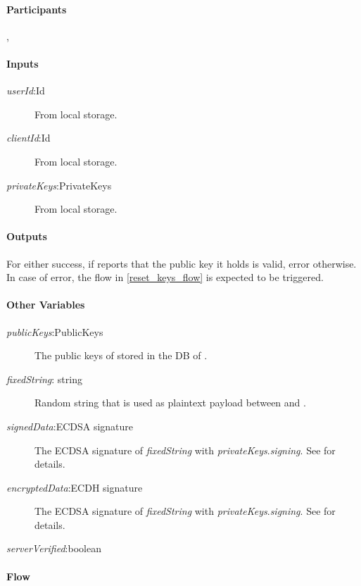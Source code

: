 \documentclass[a4paper,10pt,draft]{article}
\newcommand{\signedData}{\emph{signedData}}
\newcommand{\encryptedData}{\emph{encryptedData}}
\newcommand{\serverVerified}{\emph{serverVerified}}
\newcommand{\privateKeys}{\emph{privateKeys}}
\newcommand{\publicKeys}{\emph{publicKeys}}
\newcommand{\signingKey}{\privateKeys{}.\emph{signing}}
\newcommand{\userId}{\emph{userId}}
\newcommand{\clientId}{\emph{clientId}}
\newcommand{\fixedString}{\emph{fixedString}}
\begin{document}
\paragraph{Participants} \Client{}, \Server{}

\paragraph{Inputs}
\SpecialItem
\begin{description}
 \item[\userId{}:Id] From \Client{} local storage.
 \item[\clientId{}:Id] From \Client{} local storage.
 \item[\privateKeys{}:PrivateKeys] From \Client{} local storage.
\end{description}

\paragraph{Outputs}
For \Client{} either success, if \Server{} reports that the public key it holds is valid, error otherwise. In case of error, the flow in 
\ref{reset_keys_flow} is expected to be triggered.

\paragraph{Other Variables}
\SpecialItem
\begin{description}
 \item[\publicKeys{}:PublicKeys] The public keys of \Client{} stored in the DB of \Server{}.
 \item[\fixedString{}: string] Random string that is used as plaintext payload between \Server{} and \Client{}.
 \item[\signedData{}:ECDSA signature] The ECDSA signature of \fixedString{} with \signingKey{}. See \cite{crypto_spec} for details.
 \item[\encryptedData{}:ECDH signature] The ECDSA signature of \fixedString{} with \signingKey{}. See \cite{crypto_spec} for details.
 \item[\serverVerified{}:boolean]
\end{description}

\paragraph{Flow}
\end{document}
